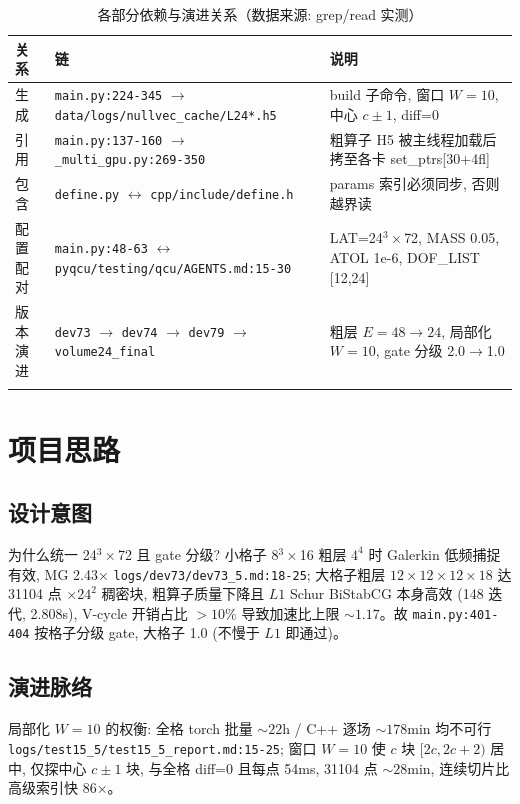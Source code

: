 \documentclass[UTF8]{ctexart}
\begin{document}
\begin{xltabular}{\textwidth}{llX}
\toprule
关系 & 链 & 说明 \\
\midrule
\endhead
生成 & \texttt{\nolinkurl{main.py:224-345}} $\to$ \texttt{\nolinkurl{data/logs/nullvec_cache/L24*.h5}} & build 子命令, 窗口 $W=10$, 中心 $c\pm1$, diff=0 \\
引用 & \texttt{\nolinkurl{main.py:137-160}} $\to$ \texttt{\nolinkurl{_multi_gpu.py:269-350}} & 粗算子 H5 被主线程加载后拷至各卡 set\_ptrs[30+4fl] \\
包含 & \texttt{\nolinkurl{define.py}} $\leftrightarrow$ \texttt{\nolinkurl{cpp/include/define.h}} & params 索引必须同步, 否则越界读 \\
配置配对 & \texttt{\nolinkurl{main.py:48-63}} $\leftrightarrow$ \texttt{\nolinkurl{pyqcu/testing/qcu/AGENTS.md:15-30}} & LAT=24$^3\times$72, MASS 0.05, ATOL 1e-6, DOF\_LIST [12,24] \\
版本演进 & \texttt{\nolinkurl{dev73}} $\to$ \texttt{\nolinkurl{dev74}} $\to$ \texttt{\nolinkurl{dev79}} $\to$ \texttt{\nolinkurl{volume24_final}} & 粗层 $E=48\to24$, 局部化 $W=10$, gate 分级 2.0$\to$1.0 \\
\bottomrule
\caption{各部分依赖与演进关系（数据来源: grep/read 实测）}
\end{xltabular}

\section{项目思路}
\subsection{设计意图}
\textcolor{idea}{为什么统一 24$^3\times$72 且 gate 分级?} 小格子 8$^3\times$16 粗层 $4^4$ 时 Galerkin 低频捕捉有效, MG 2.43$\times$ \textcolor{evidence}{\texttt{\nolinkurl{logs/dev73/dev73_5.md:18-25}}}; 大格子粗层 $12\times12\times12\times18$ 达 31104 点 $\times 24^2$ 稠密块, 粗算子质量下降且 $L1$ Schur BiStabCG 本身高效 (148 迭代, 2.808s), V-cycle 开销占比 $>10\%$ 导致加速比上限 $\sim1.17$。故 \texttt{\nolinkurl{main.py:401-404}} 按格子分级 gate, 大格子 1.0 (不慢于 $L1$ 即通过)。

\subsection{演进脉络}
\textcolor{idea}{局部化 $W=10$ 的权衡:} 全格 torch 批量 $\sim22$h / C++ 逐场 $\sim178$min 均不可行 \textcolor{evidence}{\texttt{\nolinkurl{logs/test15_5/test15_5_report.md:15-25}}}; 窗口 $W=10$ 使 $c$ 块 $[2c,2c+2)$ 居中, 仅探中心 $c\pm1$ 块, 与全格 diff=0 且每点 54ms, 31104 点 $\sim28$min, 连续切片比高级索引快 86$\times$。
\end{document}

